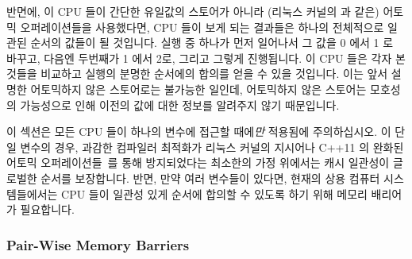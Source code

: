 반면에, 이 CPU 들이 간단한 유일값의 스토어가 아니라 (리눅스 커널의
 과 같은) 어토믹 오퍼레이션들을 사용했다면, CPU 들이
보게 되는 결과들은 하나의 전체적으로 일관된 순서의 값들이 될 것입니다.
 실행 중 하나가 먼저 일어나서 그 값을 0 에서 1 로
바꾸고, 다음엔 두번째가 1 에서 2로, 그리고 그렇게 진행됩니다.
이 CPU 들은 각자 본 것들을 비교하고  실행의 분명한
순서에의 합의를 얻을 수 있을 것입니다.
이는 앞서 설명한 어토믹하지 않은 스토어로는 불가능한 일인데, 어토믹하지 않은
스토어는 모호성의 가능성으로 인해 이전의 값에 대한 정보를 알려주지 않기
때문입니다.

이 섹션은 모든 CPU 들이 하나의 변수에 접근할 때에\emph{만} 적용됨에
주의하십시오.
이 단일 변수의 경우, 과감한 컴파일러 최적화가 리눅스 커널의 
지시어나 C++11 의 완화된 어토믹 오퍼레이션들~\cite{PeteBecker2011N3242}를 통해
방지되었다는 최소한의 가정 위에서는 캐시 일관성이 글로벌한 순서를 보장합니다.
반면, 만약 여러 변수들이 있다면, 현재의 상용 컴퓨터 시스템들에서는 CPU 들이
일관성 있게 순서에 합의할 수 있도록 하기 위해 메모리 배리어가 필요합니다.

\subsubsection{Pair-Wise Memory Barriers}


